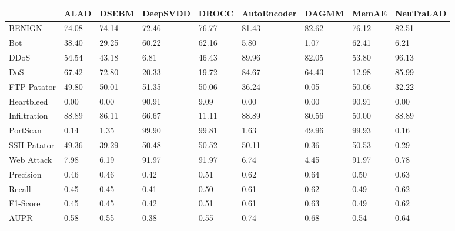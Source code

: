 \begin{tabular}{lllllllll}
\toprule
{} &   ALAD &  DSEBM & DeepSVDD &  DROCC & AutoEncoder &  DAGMM &  MemAE & NeuTraLAD \\
\midrule
BENIGN       &  74.08 &  74.14 &    72.46 &  76.77 &       81.43 &  82.62 &  76.12 &     82.51 \\
Bot          &  38.40 &  29.25 &    60.22 &  62.16 &        5.80 &   1.07 &  62.41 &      6.21 \\
DDoS         &  54.54 &  43.18 &     6.81 &  46.43 &       89.96 &  82.05 &  53.80 &     96.13 \\
DoS          &  67.42 &  72.80 &    20.33 &  19.72 &       84.67 &  64.43 &  12.98 &     85.99 \\
FTP-Patator  &  49.80 &  50.01 &    51.35 &  50.06 &       36.24 &   0.05 &  50.06 &     32.22 \\
Heartbleed   &   0.00 &   0.00 &    90.91 &   9.09 &        0.00 &   0.00 &  90.91 &      0.00 \\
Infiltration &  88.89 &  86.11 &    66.67 &  11.11 &       88.89 &  80.56 &  50.00 &     88.89 \\
PortScan     &   0.14 &   1.35 &    99.90 &  99.81 &        1.63 &  49.96 &  99.93 &      0.16 \\
SSH-Patator  &  49.36 &  39.29 &    50.48 &  50.52 &       50.11 &   0.36 &  50.53 &      0.29 \\
Web Attack   &   7.98 &   6.19 &    91.97 &  91.97 &        6.74 &   4.45 &  91.97 &      0.78 \\
Precision    &   0.46 &   0.46 &     0.42 &   0.51 &        0.62 &   0.64 &   0.50 &      0.63 \\
Recall       &   0.45 &   0.45 &     0.41 &   0.50 &        0.61 &   0.62 &   0.49 &      0.62 \\
F1-Score     &   0.45 &   0.45 &     0.42 &   0.51 &        0.61 &   0.63 &   0.49 &      0.62 \\
AUPR         &   0.58 &   0.55 &     0.38 &   0.55 &        0.74 &   0.68 &   0.54 &      0.64 \\
\bottomrule
\end{tabular}
